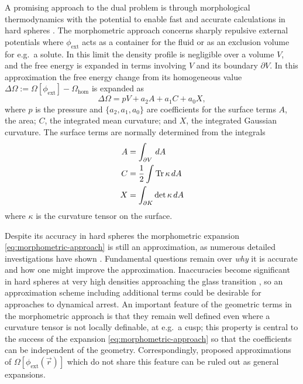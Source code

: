 \documentclass[11pt,twoside]{report}
\begin{document}
A promising approach to the dual problem is through morphological thermodynamics \cite{KonigPRL2004} with the potential to enable fast and accurate calculations in hard spheres \cite{RothPRL2006,Hansen-GoosPRL2007,RobinsonPRL2019}.
The morphometric approach concerns sharply repulsive external potentials where $\phi_\mathrm{ext}$ acts as a container for the fluid or as an exclusion volume for e.g.\ a solute.
In this limit the density profile is negligible over a volume $V$, and the free energy is expanded in terms involving $V$ and its boundary $\partial V$.
In this approximation the free energy change from its homogeneous value $\Delta \Omega := \Omega[\phi_\mathrm{ext}] - \Omega_\mathrm{hom}$ is expanded as
\begin{equation}\label{eq:morphometric-approach}
  \Delta \Omega
  =
  p V + a_2 A + a_1 C + a_0 X,
\end{equation}
where $p$ is the pressure and $\{a_2,a_1,a_0\}$ are coefficients for the surface terms $A$, the area; $C$, the integrated mean curvature; and $X$, the integrated Gaussian curvature.
The surface terms are normally determined from the integrals
\begin{subequations}
  \begin{align}
    A &= \int_{\partial V} \, dA \\
    C &= \frac{1}{2} \int \operatorname*{Tr}{\kappa} \, dA \\
    X &= \int_{\partial K} \det{\kappa} \, dA
  \end{align}
\end{subequations}
where $\kappa$ is the curvature tensor on the surface.

Despite its accuracy in hard spheres the morphometric expansion \eqref{eq:morphometric-approach} is still an approximation, as numerous detailed investigations have shown \cite{OettelEL2009,AshtonPRE2011,LairdPRE2012,BlokhuisPRE2013,UrrutiaPRE2014,Hansen-GoosJCP2014}.
Fundamental questions remain over \emph{why} it is accurate and how one might improve the approximation.
Inaccuracies become significant in hard spheres at very high densities approaching the glass transition \cite{RobinsonPRL2019,Robinson?2019}, so an approximation scheme including additional terms could be desirable for approaches to dynamical arrest.
An important feature of the geometric terms in the morphometric approach is that they remain well defined even where a curvature tensor is not locally definable, at e.g.\ a cusp; this property is central to the success of the expansion \eqref{eq:morphometric-approach} so that the coefficients can be independent of the geometry.
Correspondingly, proposed approximations of $\Omega[\phi_\mathrm{ext}(\vec{r})]$ which do not share this feature can be ruled out as general expansions.
\end{document}
